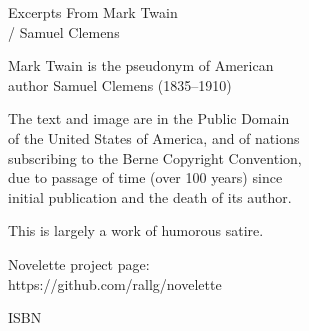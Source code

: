 \documentclass[../../demo.tex]{novelette-subdoc}
\begin{document}
\begin{pageiii} %
\null\null\null\null\null %
\null\null\null %
\vfill %
\end{pageiii}

\begin{pageiv} %
Excerpts From Mark Twain\\/ Samuel Clemens\par
Mark Twain is the pseudonym of American\\
author Samuel Clemens (1835--1910)\par
The text and image are in the Public Domain\\
of the United States of America, and of nations\\
subscribing to the Berne Copyright Convention,\\
due to passage of time (over 100 years) since\\
initial publication and the death of its author.\par
This is largely a work of humorous satire.\par
Novelette project page:\\https://github.com/rallg/novelette\par
ISBN \par
\end{pageiv}


\begin{pagev} %
\vfil
{}
\vfil
\end{pagev}
\end{document}
